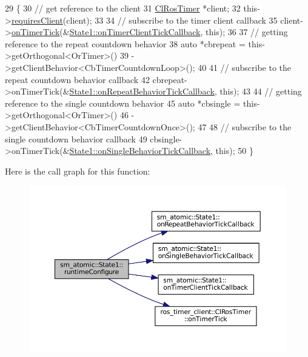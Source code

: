 \begin{DoxyCode}
29     \{
30         \textcolor{comment}{// get reference to the client}
31         \hyperlink{classros__timer__client_1_1ClRosTimer}{ClRosTimer} *client;
32         this->\hyperlink{classsmacc_1_1ISmaccState_a7f95c9f0a6ea2d6f18d1aec0519de4ac}{requiresClient}(client);
33 
34         \textcolor{comment}{// subscribe to the timer client callback}
35         client->\hyperlink{classros__timer__client_1_1ClRosTimer_a06ecf6427b5df59f29879ab3bd1f120c}{onTimerTick}(&\hyperlink{structsm__atomic_1_1State1_adea28f0a0fcedb210a29656f53aeee09}{State1::onTimerClientTickCallback},
       \textcolor{keyword}{this});
36 
37         \textcolor{comment}{// getting reference to the repeat countdown behavior}
38         \textcolor{keyword}{auto} *cbrepeat = this->getOrthogonal<OrTimer>()
39                              ->getClientBehavior<CbTimerCountdownLoop>();
40 
41         \textcolor{comment}{// subscribe to the repeat countdown behavior callback}
42         cbrepeat->onTimerTick(&\hyperlink{structsm__atomic_1_1State1_a9d2c943f02a8e0f1d7b86132ada1c6e0}{State1::onRepeatBehaviorTickCallback}, \textcolor{keyword}{
      this});
43 
44         \textcolor{comment}{// getting reference to the single countdown behavior}
45         \textcolor{keyword}{auto} *cbsingle = this->getOrthogonal<OrTimer>()
46                              ->getClientBehavior<CbTimerCountdownOnce>();
47 
48         \textcolor{comment}{// subscribe to the single countdown behavior callback}
49         cbsingle->onTimerTick(&\hyperlink{structsm__atomic_1_1State1_a9cb95d91cf5a22f0d9d079dc04bf58aa}{State1::onSingleBehaviorTickCallback}, \textcolor{keyword}{
      this});
50     \}
\end{DoxyCode}
Here is the call graph for this function\+:
\nopagebreak
\begin{figure}[H]
\begin{center}
\leavevmode
\includegraphics[width=350pt]{structsm__atomic_1_1State1_a47c2e651bb707f14d9b32f92c44f8ebc_cgraph}
\end{center}
\end{figure}
\mbox{\label{structsm__atomic_1_1State1_a299adfad0ff1e2c592c319e1fa5de114}} 
